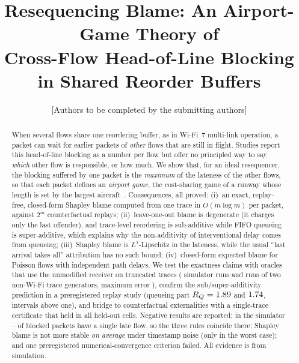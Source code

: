 \documentclass[11pt]{article}
\title{Resequencing Blame: An Airport-Game Theory of\\Cross-Flow Head-of-Line Blocking in Shared Reorder Buffers}
\author{[Authors to be completed by the submitting authors]}
\date{}
\theoremstyle{definition}
\begin{document}
\maketitle

\begin{abstract}
When several flows share one reordering buffer, as in Wi-Fi~7 multi-link operation, a packet can wait for earlier packets of \emph{other} flows that are still in flight.
Studies report this head-of-line blocking as a number per flow but offer no principled way to say \emph{which} other flow is responsible, or how much.
We show that, for an ideal resequencer, the blocking suffered by one packet is the \emph{maximum} of the lateness of the other flows, so that each packet defines an \emph{airport game}, the cost-sharing game of a runway whose length is set by the largest aircraft~\cite{littlechild1973airport}.
Consequences, all proved: (i)~an exact, replay-free, closed-form Shapley blame computed from one trace in $O(m\log m)$ per packet, against $2^{m}$ counterfactual replays; (ii)~leave-one-out blame is degenerate (it charges only the last offender), and trace-level reordering is sub-additive while FIFO queueing is super-additive, which explains why the non-additivity of interventional delay comes from queueing; (iii)~Shapley blame is $L^1$-Lipschitz in the lateness, while the usual ``last arrival takes all'' attribution has no such bound; (iv)~closed-form expected blame for Poisson flows with independent path delays.
We test the exactness claims with oracles that use the unmodified receiver on truncated traces (\FvSimRuns{} simulator runs and \FvGenRuns{} runs of two non-Wi-Fi trace generators, maximum error \FvMaxErr{}), confirm the sub/super-additivity prediction in a preregistered replay study (queueing part $R_Q=1.89{}$ and $1.74{}$, intervals above one), and bridge to counterfactual externalities with a single-trace certificate that held in all \FourDefined{} held-out cells.
Negative results are reported: in the simulator \FvSingleSimMin{}--\FvSingleSimMax{} of blocked packets have a single late flow, so the three rules coincide there; Shapley blame is not more stable \emph{on average} under timestamp noise (only in the worst case); and one preregistered numerical-convergence criterion failed.
All evidence is from simulation.
\end{abstract}
\end{document}
